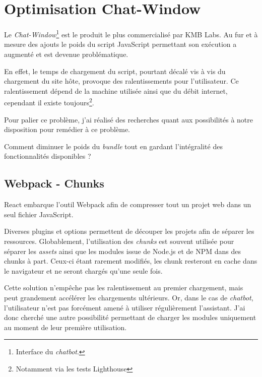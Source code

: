 \documentclass[12pt,a4paper,oneside]{scrreprt}
\begin{document}
\section{Optimisation Chat-Window}

Le \textit{Chat-Window}\footnote{Interface du \textit{chatbot}.} est le produit le plus commercialisé par KMB Labs. Au fur et à mesure des ajouts le poids du script JavaScript permettant son exécution a augmenté et est devenue problématique.

En effet, le temps de chargement du script, pourtant décalé vis à vis du chargement du site hôte, provoque des ralentissements pour l'utilisateur. Ce ralentissement dépend de la machine utilisée ainsi que du débit internet, cependant il existe toujours\footnote{Notamment via les tests Lighthouse}.

Pour palier ce problème, j'ai réalisé des recherches quant aux possibilités à notre disposition pour remédier à ce problème.

\begin{problem}
	Comment diminuer le poids du \textit{bundle} tout en gardant l'intégralité des fonctionnalités disponibles ?
\end{problem}

\subsection{Webpack - Chunks}

React embarque l'outil Webpack afin de compresser tout un projet web dans un seul fichier JavaScript.

Diverses plugins et options permettent de découper les projets afin de séparer les ressources. Globablement, l'utilisation des \textit{chunks} est souvent utilisée pour séparer les \textit{assets} ainsi que les modules issue de Node.js et de NPM dans des chunks à part. Ceux-ci étant rarement modifiés, les chunk resteront en cache dans le navigateur et ne seront chargés qu'une seule fois.

Cette solution n'empêche pas les ralentissement au premier chargement, mais peut grandement accélérer les chargements ultérieurs. Or, dans le cas de \textit{chatbot}, l'utilisateur n'est pas forcément amené à utiliser régulièrement l'assistant. J'ai donc cherché une autre possibilité permettant de charger les modules uniquement au moment de leur première utilisation.
\end{document}
